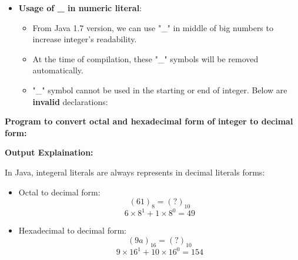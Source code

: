 \begin{flushleft}
\begin{itemize}
\begin{itemize}
		\item \textbf{Usage of \_ in numeric literal}:
		\begin{itemize}
			\item From Java 1.7 version, we can use "\_" in middle of big numbers to increase integer's readability.
			\item At the time of compilation, these "\_" symbols will be removed automatically.
			\bigskip
			\item "\_" symbol cannot be used in the starting or end of integer. Below are \textbf{invalid} declarations:
			\bigskip
						
			
		\end{itemize}
	\end{itemize}
		
	\end{itemize}

	\newpage
	\textbf{Program to convert octal and hexadecimal form of integer to decimal form:}


	\textbf{Output Explaination:}
	
	In Java, integeral literals are always represents in decimal literals forms: 
			\begin{itemize}	
				\item Octal to decimal form: 
					\[ (61)_8 = (?)_{10} \]
					\[ 6 \times 8^{1} + 1 \times 8^{0} = 49  \]
				\item Hexadecimal to decimal form:
					\[ (9a)_{16} = (?)_{10} \]
					\[ 9 \times 16^{1} + 10 \times 16^{0} = 154  \]
			\end{itemize}
			
\end{flushleft}

\newpage


